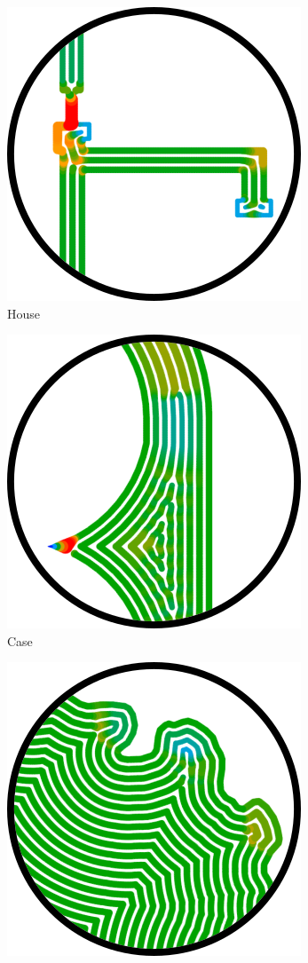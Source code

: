 \begin{figure}
\centering
\setlength{\figwidth}{0.1\textwidth}
\setlength{\figheight}{0.1\textwidth}
\begin{subfigure}{\figwidth}\centering
\includegraphics[height=\figheight]{sources/applications/house.png}
\caption{House}\label{applications_house}
\end{subfigure}
\begin{subfigure}{\figwidth}\centering
\includegraphics[height=\figheight]{sources/applications/pocket_operator_case.png}
\caption{Case}\label{applications_case}
\end{subfigure}
\begin{subfigure}{\figwidth}\centering
\includegraphics[height=\figheight]{sources/applications/david.png}

\end{subfigure}
\end{figure}
